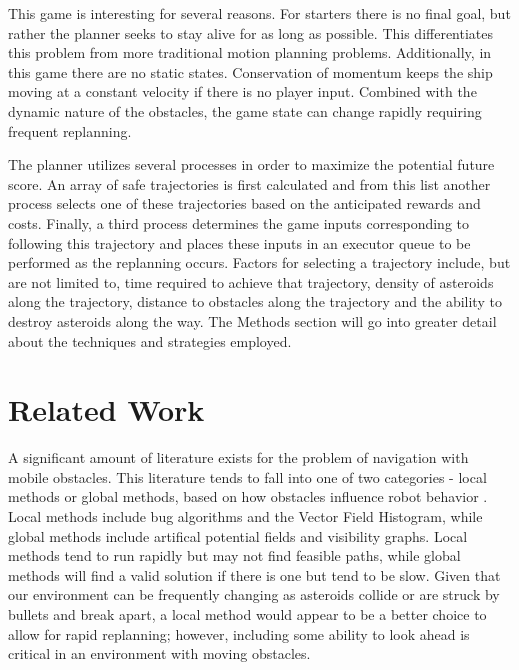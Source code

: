 \documentclass[10pt,draft,conference]{IEEEtran}
\begin{document}
This game is interesting for several reasons. For starters there is no final goal, but rather the planner seeks to stay alive for as long as possible. This differentiates this problem from more traditional motion planning problems. Additionally, in this game there are no static states. Conservation of momentum keeps the ship moving at a constant velocity if there is no player input. Combined with the dynamic nature of the obstacles, the game state can change rapidly requiring frequent replanning.

The planner utilizes several processes in order to maximize the potential future score. An array of safe trajectories is first calculated and from this list another process selects one of these trajectories based on the anticipated rewards and costs. Finally, a third process determines the game inputs corresponding to following this trajectory and places these inputs in an executor queue to be performed as the replanning occurs. Factors for selecting a trajectory include, but are not limited to, time required to achieve that trajectory, density of asteroids along the trajectory, distance to obstacles along the trajectory and the ability to destroy asteroids along the way. The Methods section will go into greater detail about the techniques and strategies employed.

\section{Related Work}

A significant amount of literature exists for the problem of navigation with mobile obstacles. This literature tends to fall into one of two categories - local methods or global methods, based on how obstacles influence robot behavior \cite{khansari2012dynamical}. Local methods include bug algorithms and the Vector Field Histogram, while global methods include artifical potential fields and visibility graphs. Local methods tend to run rapidly but may not find feasible paths, while global methods will find a valid solution if there is one but tend to be slow. Given that our environment can be frequently changing as asteroids collide or are struck by bullets and break apart, a local method would appear to be a better choice to allow for rapid replanning; however, including some ability to look ahead is critical in an environment with moving obstacles. 
\end{document}
